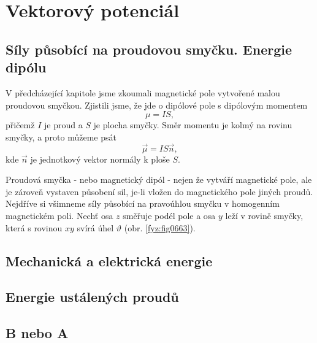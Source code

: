 \setchaptertoc
\chapter{Vektorový potenciál}\label{fyz:IIchapXV}

  \section{Síly působící na proudovou smyčku. Energie dipólu}\label{fyz:IIchapXVsecI}
    V předcházející kapitole jsme zkoumali magnetické pole vytvořené malou proudovou smyčkou.
    Zjistili jsme, že jde o dipólové pole s dipólovým momentem
    \begin{equation}\label{fyz:eq585}
      \mu = I S,
    \end{equation}
    přičemž \(I\) je proud a \(S\) je plocha smyčky. Směr momentu je kolmý na rovinu smyčky, a proto
    můžeme psát
    \begin{equation}\label{fyz:eq586}
      \vec{\mu} = I S\vec{n},
    \end{equation}
    kde \(\vec{n}\) je jednotkový vektor normály k ploše \(S\).

    Proudová smyčka - nebo magnetický dipól - nejen že vytváří magnetické pole, ale je zároveň
    vystaven působení sil, je-li vložen do magnetického pole jiných proudů. Nejdříve si všimneme
    síly působící na pravoúhlou smyčku v homogenním magnetickém poli. Nechť osa \(z\) směřuje podél
    pole a osa \(y\) leží v rovině smyčky, která s rovinou \(xy\) svírá úhel \(\vartheta\) (obr.
    \ref{fyz:fig0663}). 

  \section{Mechanická a elektrická energie}\label{fyz:IIchapXVsecII}
  \section{Energie ustálených proudů}\label{fyz:IIchapXVsecIII}
  \section{B nebo A}\label{fyz:IIchapXVsecIV}
